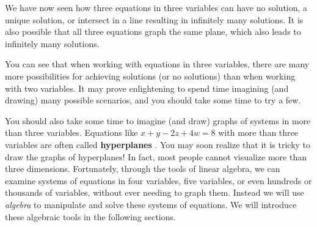 We have now seen how three equations in three variables can have no solution, a unique solution, or intersect in a line resulting in infinitely many solutions. 
It is also possible that all three equations graph the same plane, which also leads to infinitely many solutions. 

You can see that when working with equations in three variables, there are
many more possibilities for achieving solutions (or no solutions) than when working with two variables. It may prove enlightening to 
spend time imagining (and drawing) many possible scenarios, and you should take some time to try a few. 

You should also take some time to imagine (and draw) graphs of systems in more than three variables. 
Equations  like $x+y-2z+4w=8$ with more than three variables are often
called \textbf{hyperplanes}%
%
.
You may soon realize that it is tricky to draw the graphs of hyperplanes! In fact, most people cannot visualize more than three dimensions. Fortunately, through the tools of linear algebra, 
we can examine systems of equations in four variables, five variables, or even hundreds or thousands of variables, without ever needing to graph them. Instead we will use {\em algebra} to manipulate and solve these systems of equations. We will introduce these algebraic tools in the following sections.
